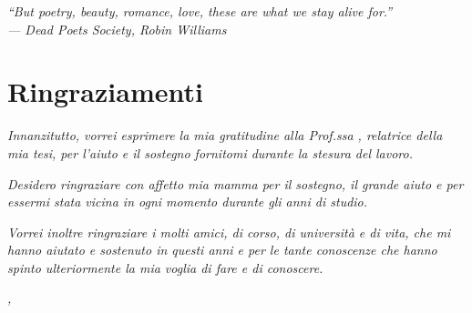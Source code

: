 \cleardoublepage{}

\begin{flushright}
    \slshape
    ``But poetry, beauty, romance, love, these are what we stay alive for.''\ \\
    \medskip
    --- Dead Poets Society, Robin Williams
\end{flushright}


\bigskip

\begingroup
\let\clearpage\relax
\let\cleardoublepage\relax
\let\cleardoublepage\relax

\chapter*{Ringraziamenti}

\noindent \textit{Innanzitutto, vorrei esprimere la mia gratitudine alla Prof.ssa \myProf, relatrice della mia tesi, per l'aiuto e il sostegno fornitomi durante la stesura del lavoro.}

\noindent \textit{Desidero ringraziare con affetto mia mamma per il sostegno, il grande aiuto e per essermi stata vicina in ogni momento durante gli anni di studio.}

\noindent \textit{Vorrei inoltre ringraziare i molti amici, di corso, di università e di vita, che mi hanno aiutato e sostenuto in questi anni e per le tante conoscenze che hanno spinto ulteriormente la mia voglia di fare e di conoscere.}
\bigskip

\noindent\textit{\myLocation, \myTime}
\hfill \myName\endgroup
